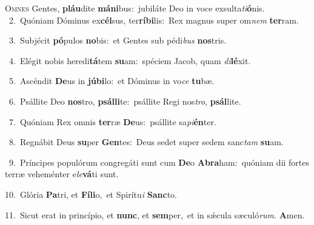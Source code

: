 \lettrine{\initial\textcolor{\initialcolor}{O}}{mnes} Gentes, \textbf{pláu}\-dite \textbf{má}\-\textbf{ni}bus:~\star jubiláte Deo in voce exsulta\-\textit{ti}\-\textbf{ó}nis.\\
{\numbfont\textcolor{\numbcolor}{~2.}}~Quóniam Dóminus ex\-\textbf{cél}\-sus, ter\-\textbf{rí}\-\textbf{bi}lis:~\star Rex magnus super om\textit{nem} \textbf{ter}\-ram.\par
{\numbfont\textcolor{\numbcolor}{~3.}}~Subjécit \textbf{pó}\-pulos \textbf{no}\-bis:~\star et Gentes sub pédi\textit{bus} \textbf{nos}\-tris.\par
{\numbfont\textcolor{\numbcolor}{~4.}}~Elégit nobis heredi\-\textbf{tá}\-tem \textbf{su}\-am:~\star spéciem Jacob, quam \textit{di}\-\textbf{lé}xit.\par
{\numbfont\textcolor{\numbcolor}{~5.}}~Ascéndit \textbf{De}\-us in \textbf{jú}\-\textbf{bi}lo:~\star et Dóminus in vo\textit{ce} \textbf{tu}\-bæ.\par
{\numbfont\textcolor{\numbcolor}{~6.}}~Psállite Deo \textbf{nos}\-tro, \textbf{psál}\-\textbf{li}te:~\star psállite Regi nos\-\textit{tro}\-, \textbf{psál}\-lite.\par
{\numbfont\textcolor{\numbcolor}{~7.}}~Quóniam Rex omnis \textbf{ter}\-ræ \textbf{De}\-us:~\star psállite sa\-\textit{pi}\-\textbf{én}ter.\par
{\numbfont\textcolor{\numbcolor}{~8.}}~Regnábit Deus \textbf{su}\-per \textbf{Gen}\-tes:~\star Deus sedet super sedem sanc\textit{tam} \textbf{su}\-am.\par
{\numbfont\textcolor{\numbcolor}{~9.}}~Príncipes populórum congregáti sunt cum \textbf{De}\-o \textbf{A}\-\textbf{bra}ham:~\star quóniam dii fortes terræ veheménter e\-\textit{le}\-\textbf{vá}ti sunt.\par
{\numbfont\textcolor{\numbcolor}{10.}}~Glória \textbf{Pa}\-tri, et \textbf{Fí}\-\textbf{li}o,~\star et Spirítu\textit{i} \textbf{Sanc}\-to.\par
{\numbfont\textcolor{\numbcolor}{11.}}~Sicut erat in princípio, et \textbf{nunc}\-, et \textbf{sem}\-per,~\star et in sǽcula sæculó\-\textit{rum}\-. \textbf{A}\-men.\par
